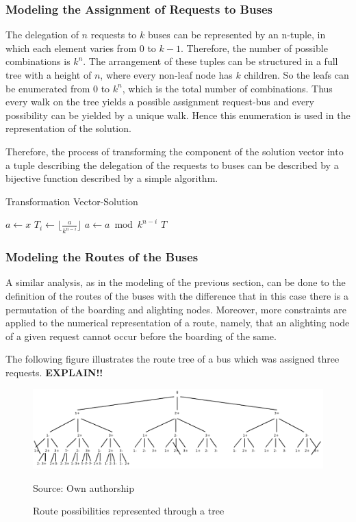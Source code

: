 \documentclass[tuberlin,cic,tc,openright,english,noabntcite,oneside]{iiufrgs}
\begin{document}
\subsubsection{Modeling the Assignment of Requests to Buses}
The delegation of $n$ requests to $k$ buses can be represented by an n-tuple, in which each element varies from $0$ to $k-1$. Therefore, the number of possible combinations is $k^{n}$. The arrangement of these tuples can be structured in a full tree with a height of $n$, where every non-leaf node has $k$ children. So the leafs can be enumerated from $0$ to $k^{n}$, which is the total number of combinations. Thus every walk on the tree yields a possible assignment request-bus and every possibility can be yielded by a unique walk. Hence this enumeration is used in the representation of the solution.

Therefore, the process of transforming the component of the solution vector into a tuple describing the delegation of the requests to buses can be described by a bijective function described by a simple algorithm.
\begin{algorithm}[H]
\caption{Transformation Vector-Solution}
\begin{algorithmic}
\State $a \gets x$
	\State $\displaystyle T_{i} \gets \lfloor \frac{a}{k^{n-i}} \rfloor$
	\State $a \gets a \bmod k^{n-i}$
\EndFor
\State \Return $T$
\EndFunction
\end{algorithmic}
\end{algorithm}

\subsubsection{Modeling the Routes of the Buses}
A similar analysis, as in the modeling of the previous section, can be done to the definition of the routes of the buses with the difference that in this case there is a permutation of the boarding and alighting nodes. Moreover, more constraints are applied to the numerical representation of a route, namely, that an alighting node of a given request cannot occur before the boarding of the same.

The following figure illustrates the route tree of a bus which was assigned three requests. \textbf{EXPLAIN!!}
\begin{figure}[H]
    \caption{Route possibilities represented through a tree}
    \begin{center}
        \includegraphics[width=\textwidth]{fig_tree_bus_route}
    \end{center}
    \center Source: Own authorship
    \label{fig:tree_bus_route}
\end{figure}
\end{document}
